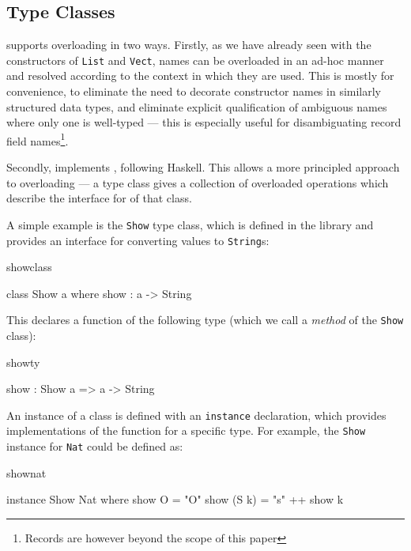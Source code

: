 \subsection{Type Classes}

\Idris{} supports overloading in two ways. Firstly, as we have already seen with
the constructors of \texttt{List} and \texttt{Vect}, names
can be overloaded in an ad-hoc manner and resolved according to the context in which
they are used. This is mostly for convenience, to eliminate the need to decorate
constructor names in similarly structured data types, and eliminate explicit qualification
of ambiguous names where only one is well-typed --- this is especially useful
for disambiguating record field names\footnote{Records are however beyond the scope
of this paper}.

Secondly, \Idris{} implements , following Haskell.  This
allows a more principled approach to overloading --- a type class gives a
collection of overloaded operations which describe the interface for
 of that class.

A simple example
is the \texttt{Show} type class, which is defined in the library and
provides an interface for converting values to
\texttt{String}s:

\begin{SaveVerbatim}{showclass}

class Show a where
    show : a -> String

\end{SaveVerbatim}

\noindent
This declares a function of the following type (which we call a \emph{method} of the 
\texttt{Show} class):

\begin{SaveVerbatim}{showty}

show : Show a => a -> String

\end{SaveVerbatim}

An instance of a class
is defined with an \texttt{instance} declaration, which provides implementations of
the function for a specific type. For example, the \texttt{Show} instance for \texttt{Nat}
could be defined as:

\begin{SaveVerbatim}{shownat}

instance Show Nat where
    show O = "O"
    show (S k) = "s" ++ show k

\end{SaveVerbatim}

